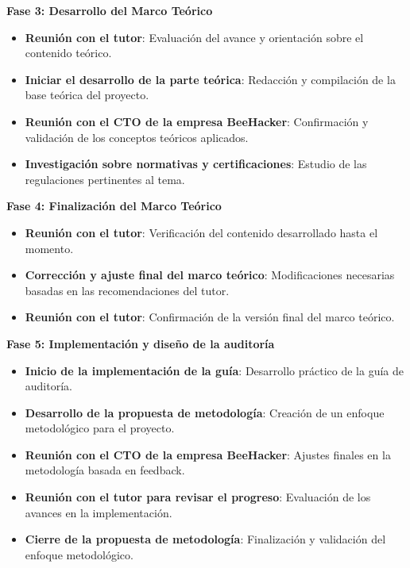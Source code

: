 \documentclass[a4paper, 10pt]{article}
\begin{document}
\vspace{0.5cm}

\textbf{Fase 3: Desarrollo del Marco Teórico}
\begin{itemize}
    \item \textbf{Reunión con el tutor}: Evaluación del avance y orientación sobre el contenido teórico.
    \item \textbf{Iniciar el desarrollo de la parte teórica}: Redacción y compilación de la base teórica del proyecto.
    \item \textbf{Reunión con el CTO de la empresa BeeHacker}: Confirmación y validación de los conceptos teóricos aplicados.
    \item \textbf{Investigación sobre normativas y certificaciones}: Estudio de las regulaciones pertinentes al tema.
\end{itemize}

\vspace{0.5cm}

\textbf{Fase 4: Finalización del Marco Teórico}
\begin{itemize}
    \item \textbf{Reunión con el tutor}: Verificación del contenido desarrollado hasta el momento.
    \item \textbf{Corrección y ajuste final del marco teórico}: Modificaciones necesarias basadas en las recomendaciones del tutor.
    \item \textbf{Reunión con el tutor}: Confirmación de la versión final del marco teórico.
\end{itemize}

\vspace{0.5cm}

\textbf{Fase 5: Implementación y diseño de la auditoría}
\begin{itemize}
    \item \textbf{Inicio de la implementación de la guía}: Desarrollo práctico de la guía de auditoría.
    \item \textbf{Desarrollo de la propuesta de metodología}: Creación de un enfoque metodológico para el proyecto.
    \item \textbf{Reunión con el CTO de la empresa BeeHacker}: Ajustes finales en la metodología basada en feedback.
    \item \textbf{Reunión con el tutor para revisar el progreso}: Evaluación de los avances en la implementación.
    \item \textbf{Cierre de la propuesta de metodología}: Finalización y validación del enfoque metodológico.
\end{itemize}
\end{document}
